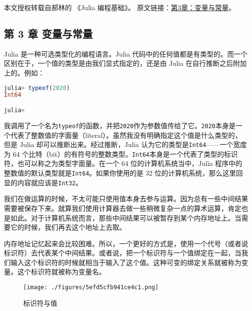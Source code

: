 
本文授权转载自郝林的 《Julia 编程基础》。 原文链接：\href{https://github.com/hyper0x/JuliaBasics/blob/master/book/ch03.md}{第3章：变量与常量}。


\subsection{第 3 章 变量与常量}

Julia 是一种可选类型化的编程语言。Julia 代码中的任何值都是有类型的。而一个区别在于，一个值的类型是由我们显式指定的，还是由 Julia 在自行推断之后附加上的。例如：

\begin{lstlisting}[language=julia]
julia> typeof(2020)
Int64

julia> 
\end{lstlisting}

我调用了一个名为\verb|typeof|的函数，并把\verb|2020|作为参数值传给了它。\verb|2020|本身是一个代表了整数值的字面量（literal）。虽然我没有明确指定这个值是什么类型的，但是 Julia 却可以推断出来。经过推断，Julia 认为它的类型是\verb|Int64|——一个宽度为 64 个比特（bit）的有符号的整数类型。\verb|Int64|本身是一个代表了类型的标识符，也可以称之为类型字面量。在一个 64 位的计算机系统当中，Julia 程序中的整数值的默认类型就是\verb|Int64|。如果你使用的是 32 位的计算机系统，那么这里回显的内容就应该是\verb|Int32|。

我们在做运算的时候，不太可能只使用值本身去参与运算。因为总有一些中间结果需要被保存下来。就算我们使用计算器去做一些稍微复杂一点的算术运算，肯定也是如此。对于计算机系统而言，那些中间结果可以被暂存到某个内存地址上。当需要它的时候，我们再去这个地址上去取。

内存地址记忆起来会比较困难。所以，一个更好的方式是，使用一个代号（或者说标识符）去代表某个中间结果。或者说，把一个标识符与一个值绑定在一起，当我们输入这个标识符的时候就相当于输入了这个值。这种可变的绑定关系就被称为变量。这个标识符就被称为变量名。

\begin{figure}[ht]
\centering
\texttt{[image: ./figures/5efd5cfb941ce4c1.png]}
\caption{标识符与值} \label{fig_JuC3S0_1}
\end{figure}
